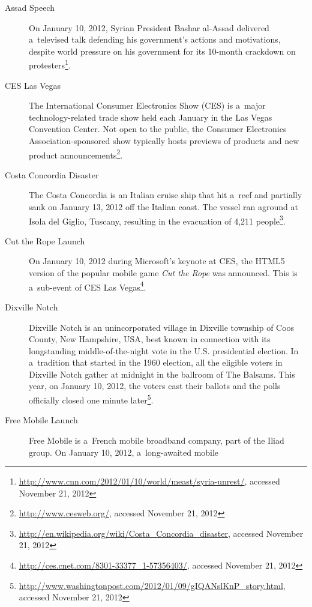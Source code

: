 \begin{description}
  \item[Assad Speech]
       On January 10, 2012, Syrian President Bashar al-Assad
       delivered a~televised talk defending his
       government's actions and motivations, despite world
       pressure on his government for its 10-month
       crackdown on
       protesters\footnote{\url{http://www.cnn.com/2012/01/10/world/meast/syria-unrest/},
       accessed November 21, 2012}.
  \item[CES Las Vegas]
       The International Consumer Electronics Show (CES) is
       a~major technology-related trade show held each January
       in the Las Vegas Convention Center. Not open to the public,
       the Consumer Electronics Association-sponsored show
       typically hosts previews of products and new product
       announcements\footnote{\url{http://www.cesweb.org/},
       accessed November 21, 2012}.
  \item[Costa Concordia Disaster]
       The Costa Concordia is an Italian cruise ship that hit
       a~reef and partially sank on January 13, 2012 off the
       Italian coast. The vessel ran aground at Isola del Giglio,
       Tuscany, resulting in the evacuation of 4,211
       people\footnote{\url{http://en.wikipedia.org/wiki/Costa_Concordia_disaster},
       accessed November 21, 2012}.
  \item[Cut the Rope Launch]
       On January 10, 2012 during Microsoft's keynote at CES, the
       HTML5 version of the popular mobile game \textit{Cut the
       Rope} was announced. This is a~sub-event of CES Las
       Vegas\footnote{\url{http://ces.cnet.com/8301-33377_1-57356403/},
       accessed November 21, 2012}.
  \item[Dixville Notch]
       Dixville Notch is an unincorporated village in Dixville
       township of Coos County, New Hampshire, USA, best known in
       connection with its longstanding middle-of-the-night vote in
       the U.S. presidential election. In a~tradition that started
       in the 1960 election, all the eligible voters in Dixville
       Notch gather at midnight in the ballroom of The Balsams.
       This year, on January 10, 2012, the voters cast their
       ballots and the polls officially closed one minute
       later\footnote{\url{http://www.washingtonpost.com/2012/01/09/gIQANslKnP_story.html},
       accessed November 21, 2012}.
  \item[Free Mobile Launch]
       Free Mobile is a~French mobile broadband company, part of
       the Iliad group. On January 10, 2012, a~long-awaited mobile

\end{description}
